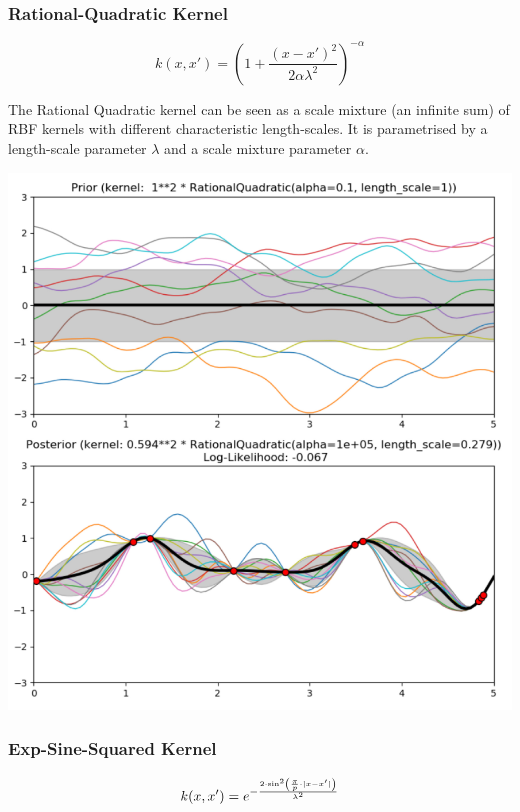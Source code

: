 \documentclass[11pt]{article}
\theoremstyle{definition}
\DeclarePairedDelimiter\abs{\lvert}{\rvert}
\begin{document}
\subsubsection{Rational-Quadratic Kernel}
\begin{equation*}
	k(x,x') = \left( 1 + \frac{(x-x')^2}{2\alpha\lambda^2} \right)^{-\alpha}
\end{equation*}

\noindent
\begin{minipage}{0.55\linewidth}
	The Rational Quadratic kernel can be seen as a scale mixture (an infinite sum) of RBF kernels with different characteristic length-scales. It is parametrised by a length-scale parameter $\lambda$ and a scale mixture parameter $\alpha$.
\end{minipage}
\hfill
\begin{minipage}{0.42\linewidth}
	\includegraphics[width=\linewidth]{img/rational_quadratic_kernel}
\end{minipage}

\subsubsection{Exp-Sine-Squared Kernel}
\begin{equation*}
	k(x,x') = e^{-\frac{2\cdot \sin^2\left(\frac{\pi}{p}\cdot\abs{x-x'}\right)}{\lambda^2}}
\end{equation*}
\end{document}

